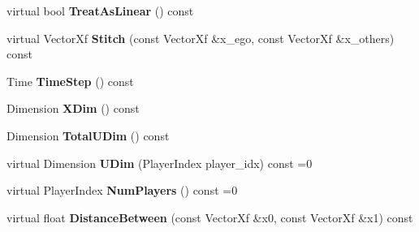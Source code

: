 \begin{DoxyCompactItemize}
\item 
virtual bool {\bfseries Treat\+As\+Linear} () const \hypertarget{classilqgames_1_1_multi_player_integrable_system_adf8ab89fd04892a1806814ef4ce89188}{}\label{classilqgames_1_1_multi_player_integrable_system_adf8ab89fd04892a1806814ef4ce89188}

\item 
virtual Vector\+Xf {\bfseries Stitch} (const Vector\+Xf \&x\+\_\+ego, const Vector\+Xf \&x\+\_\+others) const \hypertarget{classilqgames_1_1_multi_player_integrable_system_a027ab5dea23c68ea74040a50a7b16c31}{}\label{classilqgames_1_1_multi_player_integrable_system_a027ab5dea23c68ea74040a50a7b16c31}

\item 
Time {\bfseries Time\+Step} () const \hypertarget{classilqgames_1_1_multi_player_integrable_system_a1dfd36e77c611fb9d72ba7d2f66dbc08}{}\label{classilqgames_1_1_multi_player_integrable_system_a1dfd36e77c611fb9d72ba7d2f66dbc08}

\item 
Dimension {\bfseries X\+Dim} () const \hypertarget{classilqgames_1_1_multi_player_integrable_system_a1f3d72304e04f6906e6e1066717411a7}{}\label{classilqgames_1_1_multi_player_integrable_system_a1f3d72304e04f6906e6e1066717411a7}

\item 
Dimension {\bfseries Total\+U\+Dim} () const \hypertarget{classilqgames_1_1_multi_player_integrable_system_ac6fc71106bffdff776a55792af4560d1}{}\label{classilqgames_1_1_multi_player_integrable_system_ac6fc71106bffdff776a55792af4560d1}

\item 
virtual Dimension {\bfseries U\+Dim} (Player\+Index player\+\_\+idx) const =0\hypertarget{classilqgames_1_1_multi_player_integrable_system_a89563d59d8cda88e0825992b86c9a146}{}\label{classilqgames_1_1_multi_player_integrable_system_a89563d59d8cda88e0825992b86c9a146}

\item 
virtual Player\+Index {\bfseries Num\+Players} () const =0\hypertarget{classilqgames_1_1_multi_player_integrable_system_a894daac1bf9f941718529e5a31b81a88}{}\label{classilqgames_1_1_multi_player_integrable_system_a894daac1bf9f941718529e5a31b81a88}

\item 
virtual float {\bfseries Distance\+Between} (const Vector\+Xf \&x0, const Vector\+Xf \&x1) const \hypertarget{classilqgames_1_1_multi_player_integrable_system_af25dee45970bc4e53a3844084bc3fad4}{}\label{classilqgames_1_1_multi_player_integrable_system_af25dee45970bc4e53a3844084bc3fad4}

\end{DoxyCompactItemize}
